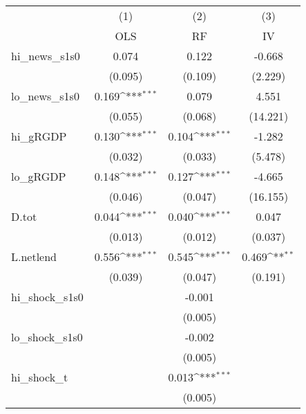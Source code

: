 {
\def\sym#1{\ifmmode^{#1}\else\(^{#1}\)\fi}
\begin{tabular}{l*{3}{c}}
\toprule
            &\multicolumn{1}{c}{(1)}&\multicolumn{1}{c}{(2)}&\multicolumn{1}{c}{(3)}\\
            &\multicolumn{1}{c}{OLS}&\multicolumn{1}{c}{RF}&\multicolumn{1}{c}{IV}\\
\midrule
hi\_news\_s1s0&       0.074         &       0.122         &      -0.668         \\
            &     (0.095)         &     (0.109)         &     (2.229)         \\
\addlinespace
lo\_news\_s1s0&       0.169\sym{***}&       0.079         &       4.551         \\
            &     (0.055)         &     (0.068)         &    (14.221)         \\
\addlinespace
hi\_gRGDP    &       0.130\sym{***}&       0.104\sym{***}&      -1.282         \\
            &     (0.032)         &     (0.033)         &     (5.478)         \\
\addlinespace
lo\_gRGDP    &       0.148\sym{***}&       0.127\sym{***}&      -4.665         \\
            &     (0.046)         &     (0.047)         &    (16.155)         \\
\addlinespace
D.tot       &       0.044\sym{***}&       0.040\sym{***}&       0.047         \\
            &     (0.013)         &     (0.012)         &     (0.037)         \\
\addlinespace
L.netlend   &       0.556\sym{***}&       0.545\sym{***}&       0.469\sym{**} \\
            &     (0.039)         &     (0.047)         &     (0.191)         \\
\addlinespace
hi\_shock\_s1s0&                     &      -0.001         &                     \\
            &                     &     (0.005)         &                     \\
\addlinespace
lo\_shock\_s1s0&                     &      -0.002         &                     \\
            &                     &     (0.005)         &                     \\
\addlinespace
hi\_shock\_t  &                     &       0.013\sym{***}&                     \\
            &                     &     (0.005)         &                     \\

\end{tabular}}
